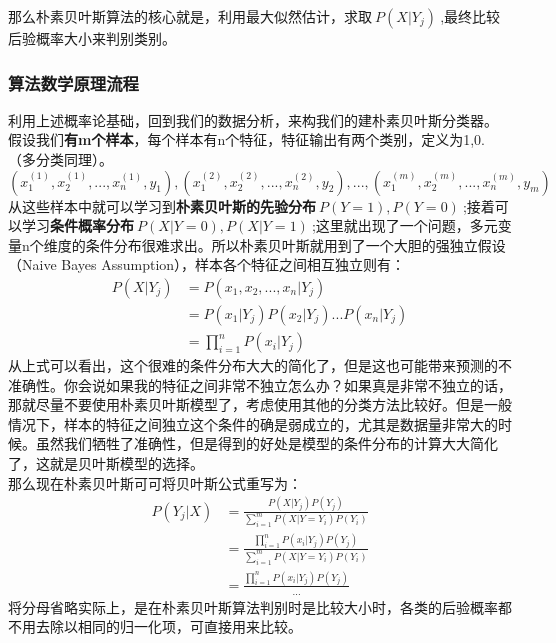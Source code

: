 那么朴素贝叶斯算法的核心就是，利用最大似然估计，求取$~P(X|Y_j)~$,最终比较后验概率大小来判别类别。
\subsubsection{算法数学原理流程}
利用上述概率论基础，回到我们的数据分析，来构我们的建朴素贝叶斯分类器。\\
假设我们\textbf{有m个样本}，每个样本有n个特征，特征输出有两个类别，定义为1,0.（多分类同理）。
$$(x_1^{(1)},x_2^{(1)},...,x_n^{(1)},y_1),(x_1^{(2)},x_2^{(2)},...,x_n^{(2)},y_2),...,(x_1^{(m)},x_2^{(m)},...,x_n^{(m)},y_m)$$
从这些样本中就可以学习到\textbf{朴素贝叶斯的先验分布}$~P(Y=1),P(Y=0)~$;接着可以学习\textbf{条件概率分布}$~P(X|Y=0),P(X|Y=1)~$;这里就出现了一个问题，多元变量n个维度的条件分布很难求出。所以朴素贝叶斯就用到了一个大胆的强独立假设（Naive Bayes Assumption），样本各个特征之间相互独立则有：
\begin{equation}\nonumber
\begin{split}
  P(X|Y_j)&=P(x_1,x_2,...,x_n|Y_j)\\
            &=P(x_1|Y_j)P(x_2|Y_j)...P(x_n|Y_j)\\
            &=\prod_{i=1}^{n}P(x_i|Y_j)
\end{split}
\end{equation}
从上式可以看出，这个很难的条件分布大大的简化了，但是这也可能带来预测的不准确性。你会说如果我的特征之间非常不独立怎么办？如果真是非常不独立的话，那就尽量不要使用朴素贝叶斯模型了，考虑使用其他的分类方法比较好。但是一般情况下，样本的特征之间独立这个条件的确是弱成立的，尤其是数据量非常大的时候。虽然我们牺牲了准确性，但是得到的好处是模型的条件分布的计算大大简化了，这就是贝叶斯模型的选择。\\
那么现在朴素贝叶斯可可将贝叶斯公式重写为：
\begin{equation}\nonumber
\begin{split}
  P(Y_j|X)&=\frac{P(X|Y_j)P(Y_j)}{\sum_{i=1}^{m}P(X|Y=Y_i)P(Y_i)}\\
          &=\frac{\prod_{i=1}^{n}P(x_i|Y_j)P(Y_j)}{\sum_{i=1}^{m}P(X|Y=Y_i)P(Y_i)}\\
          &=\frac{\prod_{i=1}^{n}P(x_i|Y_j)P(Y_j)}{...}
\end{split}
\end{equation}
将分母省略实际上，是在朴素贝叶斯算法判别时是比较大小时，各类的后验概率都不用去除以相同的归一化项，可直接用来比较。












